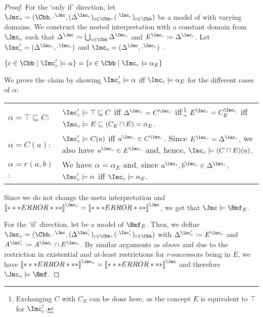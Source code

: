 \begin{proof}
  For the `only if' direction, let
  $\J_{v} = (\Cbb,\cdot^{\J},(\Delta^{\I_{c}})_{c\in\Cbb},(\cdot^{\I_c})_{c\in\Cbb})$ be a model of
  \Bmf with varying domains. We construct the nested interpretation \JJ with a constant domain from
  $\J_{v}$ such that $\Delta^{\J}\coloneqq\bigcup_{c\in\Cbb}\Delta^{\I_{c}}$ and
  $E^{\I_{c}} \coloneqq \Delta^{\I_{c}}$. Let $\I'_{c} = (\Delta^{\I_{c}}, \cdot^{\I_{c}})$ and
  $\I_{c} = (\Delta^{\J}, \cdot^{\I_{c}})$ .
  \begin{claim}
    $\{c\in\Cbb \mid \I'_{c}\models \alpha\} = \{c\in\Cbb \mid \I_{c}\models \alpha_{E}\}$
  \end{claim}
  \begin{claimproof}
    We prove the claim by showing $\I'_{c}\models\alpha$ iff $\I_{c}\models\alpha_{E}$ for the
    different cases of $\alpha$:

    \noindent
    \begin{tabularx}{\linewidth}{lX}
      $\alpha = \top \sqsubseteq C$: & $\I'_{c}\models \top \sqsubseteq C$ 
                                       iff $\Delta^{\I_{c}} = C^{\I_{c}}$
                                       iff\,\footnote{Exchanging $C$ with $C_{E}$ can be done here, as the concept
    $E$ is equivalent to $\top$ for $\I'_{c}$.} $E^{\I_{c}} = C_{E}^{\I_{c}}$
                                       iff $\I_{c} \models E \sqsubseteq (C_{E} \sqcap E) = \alpha_{E}$.\\
      $\alpha = C(a)$: & $\I'_{c}\models C(a)$ 
                        iff $a^{\I_{c}}\in C^{\I_{c}}$. Since $E^{\I_{c}}=\Delta^{\I_{c}}$, we also have
                         $a^{\I_{c}}\in E^{\I_{c}}$ and, hence, $\I_{c} \models (C \sqcap E)(a)$.\\
      $\alpha = r(a,b)$: & We have $\alpha = \alpha_{E}$ and, since $a^{\I_{c}}, b^{\I_{c}}\in\Delta^{\I_{c}}$,
    $\I'_{c} \models \alpha$ iff $\I_{c} \models \alpha_{E}$.
    \end{tabularx}
    
    \vspace*{-1.0\baselineskip}
  \end{claimproof}
  \noindent Since we do not change the meta interpretation and $\oax{\alpha}^{\J_{v}} =
  \oax{\alpha_{E}}^{\J}$, we get that $\J\models\Bmf_{E}$.

  For the `if' direction, let \JJ be a model of $\Bmf_{E}$. Then, we define
  $\J_{v} = (\Cbb,\cdot^{\J},(\Delta^{\I'_{c}})_{c\in\Cbb},(\cdot^{\I'_c})_{c\in\Cbb})$ with
  $\Delta^{\I'_{c}}\coloneqq E^{\I_{c}}$ and $A^{\I'_{c}} \coloneqq A^{\I_{c}} \cap E^{\I_{c}}$.  By
  similar arguments as above and due to the restriction in existential and at-least restrictions for
  $r$-successors being in $E$, we have $\oax{\alpha}^{\J_{v}} = \oax{\alpha_{E}}^{\J}$ and therefore
  $\J_{v}\models\Bmf$.
\end{proof}

